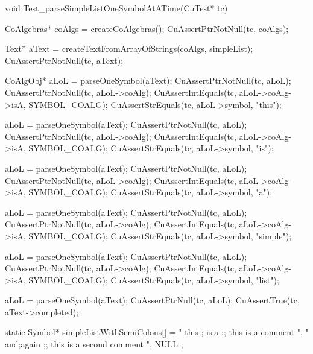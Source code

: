 void Test_parseSimpleListOneSymbolAtATime(CuTest* tc) {
  CoAlgebras* coAlgs = createCoAlgebras();
  CuAssertPtrNotNull(tc, coAlgs);

  Text* aText = createTextFromArrayOfStrings(coAlgs, simpleList);
  CuAssertPtrNotNull(tc, aText);

  CoAlgObj* aLoL = parseOneSymbol(aText);
  CuAssertPtrNotNull(tc, aLoL);
  CuAssertPtrNotNull(tc, aLoL->coAlg);
  CuAssertIntEquals(tc, aLoL->coAlg->isA, SYMBOL_COALG);
  CuAssertStrEquals(tc, aLoL->symbol, "this");

  aLoL = parseOneSymbol(aText);
  CuAssertPtrNotNull(tc, aLoL);
  CuAssertPtrNotNull(tc, aLoL->coAlg);
  CuAssertIntEquals(tc, aLoL->coAlg->isA, SYMBOL_COALG);
  CuAssertStrEquals(tc, aLoL->symbol, "is");

  aLoL = parseOneSymbol(aText);
  CuAssertPtrNotNull(tc, aLoL);
  CuAssertPtrNotNull(tc, aLoL->coAlg);
  CuAssertIntEquals(tc, aLoL->coAlg->isA, SYMBOL_COALG);
  CuAssertStrEquals(tc, aLoL->symbol, "a");

  aLoL = parseOneSymbol(aText);
  CuAssertPtrNotNull(tc, aLoL);
  CuAssertPtrNotNull(tc, aLoL->coAlg);
  CuAssertIntEquals(tc, aLoL->coAlg->isA, SYMBOL_COALG);
  CuAssertStrEquals(tc, aLoL->symbol, "simple");

  aLoL = parseOneSymbol(aText);
  CuAssertPtrNotNull(tc, aLoL);
  CuAssertPtrNotNull(tc, aLoL->coAlg);
  CuAssertIntEquals(tc, aLoL->coAlg->isA, SYMBOL_COALG);
  CuAssertStrEquals(tc, aLoL->symbol, "list");

  aLoL = parseOneSymbol(aText);
  CuAssertPtrNull(tc, aLoL);
  CuAssertTrue(tc, aText->completed);
}

static Symbol* simpleListWithSemiColons[] = {
  " this ; is;a ;; this is a comment ",
  " and;again ;; this is a second comment ",
  NULL
};


